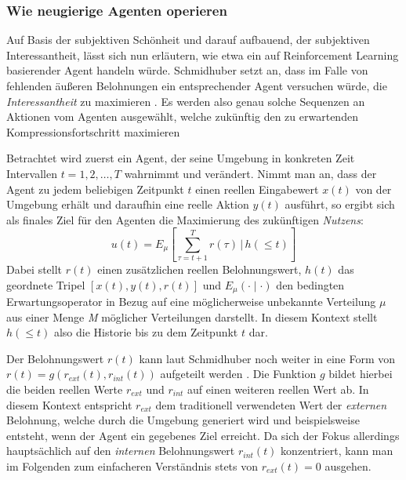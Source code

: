 \subsubsection{Wie neugierige Agenten operieren}
Auf Basis der subjektiven Schönheit und darauf aufbauend, der subjektiven Interessantheit, lässt sich nun erläutern, wie etwa ein auf Reinforcement Learning basierender Agent handeln würde. 
Schmidhuber setzt an, dass im Falle von fehlenden äußeren Belohnungen ein entsprechender Agent versuchen würde, die \emph{Interessantheit} zu maximieren \cite[p.~8]{curiosity_schmidhuber}.
Es werden also genau solche Sequenzen an Aktionen vom Agenten ausgewählt, welche zukünftig den zu erwartenden Kompressionsfortschritt maximieren \cite[p.~8]{curiosity_schmidhuber}

Betrachtet wird zuerst ein Agent, der seine Umgebung in konkreten Zeit Intervallen \(t = 1,2, \dots ,T\) wahrnimmt und verändert. 
Nimmt man an, dass der Agent zu jedem beliebigen Zeitpunkt \(t\) einen reellen Eingabewert \(x(t)\) von der Umgebung erhält und daraufhin eine reelle Aktion \(y(t)\) ausführt, so ergibt sich als finales Ziel für den Agenten die Maximierung des zukünftigen \emph{Nutzens}:
\begin{equation} \label{eq:objective_curiosity}
  u(t) = E_\mu \left[ \sum^T_{\tau=t+1} r(\tau) \, \Bigg\vert \, h(\leq t)\right]  
\end{equation}
Dabei stellt \(r(t)\) einen zusätzlichen reellen Belohnungswert, \(h(t)\) das geordnete Tripel \(\left[ x(t),y(t),r(t)\right]\) und \(E_\mu(\cdot \mid \cdot)\) den bedingten Erwartungsoperator in Bezug auf eine möglicherweise unbekannte Verteilung \(\mu\) aus einer Menge \emph{M} möglicher Verteilungen darstellt. \cite[p.~17]{curiosity_schmidhuber}
In diesem Kontext stellt \(h(\leq t)\) also die Historie bis zu dem Zeitpunkt \(t\) dar.

Der Belohnungswert \(r(t)\) kann laut Schmidhuber noch weiter in eine Form von \(r(t) = g(r_{ext}(t),r_{int}(t))\) aufgeteilt werden \cite{curiosity_schmidhuber}.
Die Funktion \(g\) bildet hierbei die beiden reellen Werte \(r_{ext}\) und \(r_{int}\) auf einen weiteren reellen Wert ab. In diesem Kontext entspricht \(r_{ext}\) dem traditionell verwendeten Wert der \emph{externen} Belohnung, welche durch die Umgebung generiert wird und beispielsweise entsteht, wenn der Agent ein gegebenes Ziel erreicht. 
Da sich der Fokus allerdings hauptsächlich auf den \emph{internen} Belohnungswert \(r_{int}(t)\) konzentriert, kann man im Folgenden zum einfacheren Verständnis stets von \(r_{ext}(t) = 0\) ausgehen.

